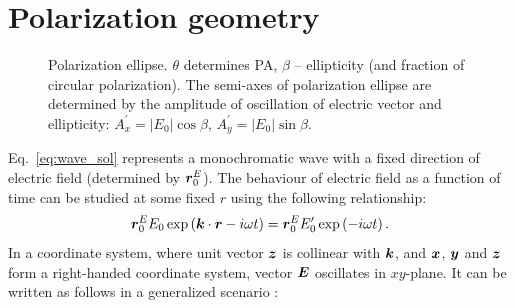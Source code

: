 \section{Polarization geometry}
\begin{figure}
    \resizebox{\linewidth}{!} {
    }
    \caption{
        Polarization ellipse. 
        $\theta$ determines \gls{PA}, $\beta$ -- ellipticity (and fraction of circular polarization).
        The semi-axes of polarization ellipse are determined by the amplitude of oscillation of electric vector and ellipticity: $A^\prime_x = |E_0|\cos \beta$, $A^\prime_y = |E_0| \sin \beta$.
        }
    \label{fig:ellipse}
\end{figure}
Eq.~\ref{eq:wave_sol} represents a monochromatic wave with a fixed direction of electric field (determined by $\boldsymbol{r}_0^E$).
The behaviour of electric field as a function of time can be studied at some fixed $r$ using the following relationship: 
\begin{equation}
    \boldsymbol{r}_0^EE_0\exp\left(\boldsymbol{k} \cdot \boldsymbol{r} - i \omega t\right) = \boldsymbol{r}_0^EE_0^\prime\exp\left(-i \omega t\right).
\end{equation}
In a coordinate system, where unit vector $\boldsymbol{z}$ is collinear with $\boldsymbol{k}$, and $\boldsymbol{x}$, $\boldsymbol{y}$ and $\boldsymbol{z}$ form a right-handed coordinate system, vector $\boldsymbol{E}$ oscillates in $xy$-plane.
It can be written as follows in a generalized scenario \citep{RadiationProcesses}:
